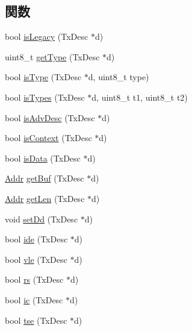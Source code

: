 \subsection*{関数}
\begin{DoxyCompactItemize}
\item 
bool \hyperlink{namespaceiGbReg_1_1TxdOp_af55d26465a475bf81ed6f357bdf7c1b1}{isLegacy} (TxDesc $\ast$d)
\item 
uint8\_\-t \hyperlink{namespaceiGbReg_1_1TxdOp_ad65ec34f7f59b2b32ca47bd649ebcb2a}{getType} (TxDesc $\ast$d)
\item 
bool \hyperlink{namespaceiGbReg_1_1TxdOp_aa03874ccb0b42e0cc137487bd84279d4}{isType} (TxDesc $\ast$d, uint8\_\-t type)
\item 
bool \hyperlink{namespaceiGbReg_1_1TxdOp_a0e959a47b95acd45e14d16adab0add82}{isTypes} (TxDesc $\ast$d, uint8\_\-t t1, uint8\_\-t t2)
\item 
bool \hyperlink{namespaceiGbReg_1_1TxdOp_a9ba8413e17f0e3e37b80982bf38e1bf1}{isAdvDesc} (TxDesc $\ast$d)
\item 
bool \hyperlink{namespaceiGbReg_1_1TxdOp_a91da43b92c742f43f0aee2bc07d15fe2}{isContext} (TxDesc $\ast$d)
\item 
bool \hyperlink{namespaceiGbReg_1_1TxdOp_a6986d9be70f07915ad25bf0892c3c5d7}{isData} (TxDesc $\ast$d)
\item 
\hyperlink{base_2types_8hh_af1bb03d6a4ee096394a6749f0a169232}{Addr} \hyperlink{namespaceiGbReg_1_1TxdOp_a363e2b2f2f55fcc8bdd1291609cc48db}{getBuf} (TxDesc $\ast$d)
\item 
\hyperlink{base_2types_8hh_af1bb03d6a4ee096394a6749f0a169232}{Addr} \hyperlink{namespaceiGbReg_1_1TxdOp_ad1ccf1bd606d966d7549916b3562aebd}{getLen} (TxDesc $\ast$d)
\item 
void \hyperlink{namespaceiGbReg_1_1TxdOp_aa4f81d41615115c41fcc39018aaff20e}{setDd} (TxDesc $\ast$d)
\item 
bool \hyperlink{namespaceiGbReg_1_1TxdOp_afdc1f7e3fdd98e21c1d3e3f5a6a06ad4}{ide} (TxDesc $\ast$d)
\item 
bool \hyperlink{namespaceiGbReg_1_1TxdOp_ad25431c134234e0709d6020ebc822a65}{vle} (TxDesc $\ast$d)
\item 
bool \hyperlink{namespaceiGbReg_1_1TxdOp_a08af38883baa50a2ca5da9e7575c9e95}{rs} (TxDesc $\ast$d)
\item 
bool \hyperlink{namespaceiGbReg_1_1TxdOp_a430ae631041ec0016452d137fef7f758}{ic} (TxDesc $\ast$d)
\item 
bool \hyperlink{namespaceiGbReg_1_1TxdOp_a264ab0660d5fb172a75fa608a9ee3644}{tse} (TxDesc $\ast$d)

\end{DoxyCompactItemize}
